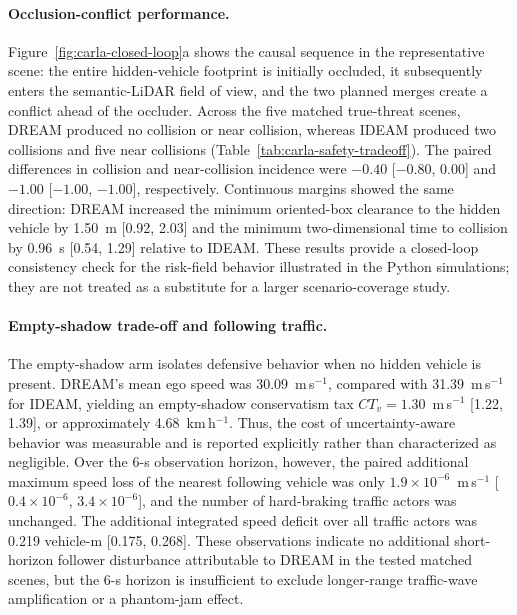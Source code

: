 \paragraph{Occlusion-conflict performance.}
Figure~\ref{fig:carla-closed-loop}a shows the causal sequence in the
representative scene: the entire hidden-vehicle footprint is initially
occluded, it subsequently enters the semantic-LiDAR field of view, and the
two planned merges create a conflict ahead of the occluder.  Across the five
matched true-threat scenes, DREAM produced no collision or near collision,
whereas IDEAM produced two collisions and five near collisions
(Table~\ref{tab:carla-safety-tradeoff}).  The paired differences in collision
and near-collision incidence were $-0.40$ [$-0.80$, $0.00$] and $-1.00$
[$-1.00$, $-1.00$], respectively.  Continuous margins showed the same
direction: DREAM increased the minimum oriented-box clearance to the hidden
vehicle by 1.50~m [0.92, 2.03] and the minimum two-dimensional time to
collision by 0.96~s [0.54, 1.29] relative to IDEAM.  These results provide a
closed-loop consistency check for the risk-field behavior illustrated in the
Python simulations; they are not treated as a substitute for a larger
scenario-coverage study.

\paragraph{Empty-shadow trade-off and following traffic.}
The empty-shadow arm isolates defensive behavior when no hidden vehicle is
present.  DREAM's mean ego speed was 30.09~m\,s$^{-1}$, compared with
31.39~m\,s$^{-1}$ for IDEAM, yielding an empty-shadow conservatism tax
$CT_v=1.30$~m\,s$^{-1}$ [1.22, 1.39], or approximately
4.68~km\,h$^{-1}$.  Thus, the cost of uncertainty-aware behavior was
measurable and is reported explicitly rather than characterized as negligible.
Over the 6-s observation horizon, however, the paired additional maximum
speed loss of the nearest following vehicle was only
$1.9\times10^{-6}$~m\,s$^{-1}$
[$0.4\times10^{-6}$, $3.4\times10^{-6}$], and the number of hard-braking
traffic actors was unchanged.  The additional integrated speed deficit over
all traffic actors was 0.219 vehicle-m [0.175, 0.268].  These observations
indicate no additional short-horizon follower disturbance attributable to
DREAM in the tested matched scenes, but the 6-s horizon is insufficient to
exclude longer-range traffic-wave amplification or a phantom-jam effect.

